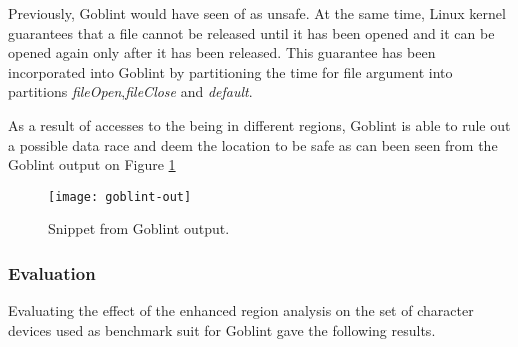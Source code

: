 \documentclass[..thesis.tex]{subfiles}
\begin{document}
Previously, Goblint would have seen  of  as unsafe. At the same time, Linux kernel guarantees that a file cannot be released until it has been opened and it can be opened again only after it has been released. This guarantee has been incorporated into Goblint by partitioning the time for file argument into partitions \textit{fileOpen},\textit{fileClose} and \textit{default}. 

As a result of accesses to the  being in different regions,  Goblint is able to rule out a possible data race and deem the location to be safe as can been seen from the Goblint output on Figure \ref{Goblint-example}

\begin{figure}[H]
\texttt{[image: goblint-out]}
\caption{Snippet from Goblint output.}
\label{Goblint-example}
\end{figure}
\subsubsection{Evaluation}


Evaluating the effect of the enhanced region analysis on the set of character devices used as benchmark suit for Goblint gave the following results.
\end{document}

